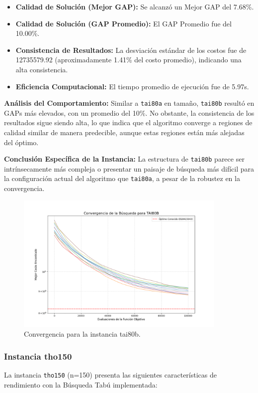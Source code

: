 \documentclass[12pt, a4paper]{article}
\begin{document}
\begin{itemize}
    \item \textbf{Calidad de Solución (Mejor GAP):} Se alcanzó un Mejor GAP del 7.68\%.
    \item \textbf{Calidad de Solución (GAP Promedio):} El GAP Promedio fue del 10.00\%.
    \item \textbf{Consistencia de Resultados:} La desviación estándar de los costos fue de 12735579.92 (aproximadamente 1.41\% del costo promedio), indicando una alta consistencia.
    \item \textbf{Eficiencia Computacional:} El tiempo promedio de ejecución fue de 5.97s.
\end{itemize}

\textbf{Análisis del Comportamiento:}
Similar a \texttt{tai80a} en tamaño, \texttt{tai80b} resultó en GAPs más elevados, con un promedio del 10\%. No obstante, la consistencia de los resultados sigue siendo alta, lo que indica que el algoritmo converge a regiones de calidad similar de manera predecible, aunque estas regiones están más alejadas del óptimo.

\textbf{Conclusión Específica de la Instancia:}
La estructura de \texttt{tai80b} parece ser intrínsecamente más compleja o presentar un paisaje de búsqueda más difícil para la configuración actual del algoritmo que \texttt{tai80a}, a pesar de la robustez en la convergencia.
\begin{figure}[H]
\centering
\includegraphics[width=0.9\textwidth]{../results/graphs/tai80b_convergence.png}
\caption{Convergencia para la instancia tai80b.}
\label{fig:tai80b_conv}
\end{figure}

\newpage
\subsubsection{Instancia tho150}
La instancia \texttt{tho150} (n=150) presenta las siguientes características de rendimiento con la Búsqueda Tabú implementada:
\end{document}
